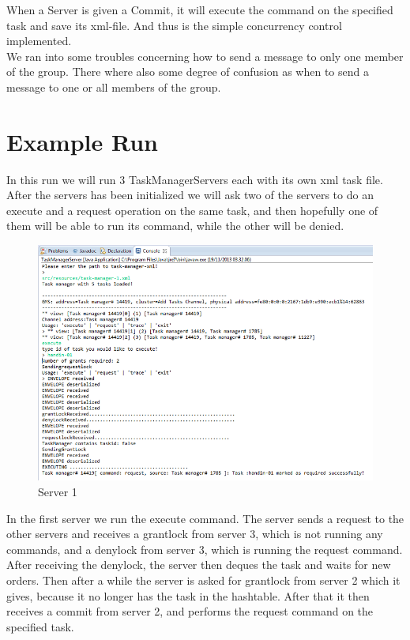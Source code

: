 When a Server is given a Commit, it will execute the command on the specified task and save its xml-file. And thus is the simple concurrency control implemented. \\

We ran into some troubles concerning how to send a message to only one member of the group. There where also some degree of confusion as when to send a message to one or all members of the group. \\


\section{Example Run}
\label{MutualExclusion_run}

In this run we will run 3 TaskManagerServers each with its own xml task file. After the servers has been initialized we will ask two of the servers to do an execute and a request operation on the same task, and then hopefully one of them will be able to run its command, while the other will be denied. \\

\begin{figure}[H]
\caption{Server 1}
\includegraphics[scale=0.6]{images/CCServer1.png}
\end{figure}
\vspace{10pt}

In the first server we run the execute command. The server sends a request to the other servers and receives a grantlock from server 3, which is not running any commands, and a denylock from server 3, which is running the request command. After receiving the denylock, the server then deques the task and waits for new orders. Then after a while the server is asked for grantlock from server 2 which it gives, because it no longer has the task in the hashtable. After that it then receives a commit from server 2, and performs the request command on the specified task. \\

